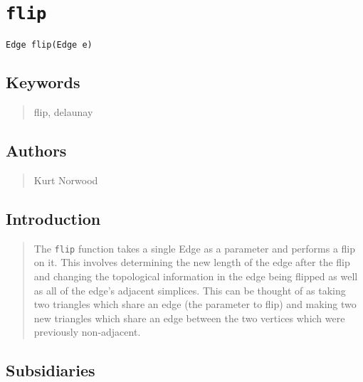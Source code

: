 \documentclass[10pt]{article}%
\begin{document}

\section*{\texttt{flip}}

\label{f0}{\small{\begin{verbatim} 
Edge flip(Edge e)
\end{verbatim}
}}

\subsection*{Keywords}

\begin{quotation} flip, delaunay\end{quotation}

\subsection*{Authors}

\begin{quotation} Kurt Norwood\end{quotation}

\subsection*{Introduction}

\begin{quotation} The \texttt{flip} function takes a single Edge as a parameter and performs a flip on it. This involves determining the new length of the edge after the flip and changing the topological information in the edge being flipped as well as all of the edge's adjacent simplices. This can be thought of as taking two triangles which share an edge (the parameter to flip) and making two new triangles which share an edge between the two vertices which were previously non-adjacent.\end{quotation}

\subsection*{Subsidiaries}
\end{document}

